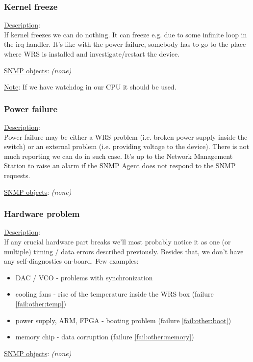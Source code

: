\subsubsection{\bf Kernel freeze}
		\begin{pck_descr}
			\item [] \underline{Description}:\\
				If kernel freezes we can do nothing. It can freeze e.g. due to some
				infinite loop in the irq handler. It's like with the power failure,
				somebody has to go to the place where WRS is installed and
				investigate/restart the device.
			\item [] \underline{SNMP objects}: \emph{(none)}
			\item [] \underline{Note}:
				If we have watchdog in our CPU it should be used.
		\end{pck_descr}

\subsubsection{\bf Power failure}
		\begin{pck_descr}
			\item [] \underline{Description}:\\
				Power failure may be either a WRS problem (i.e. broken power supply
				inside the switch) or an external problem (i.e. providing voltage to the
				device). There is not much reporting we can do in such case. It's up to
				the Network Management Station to raise an alarm if the SNMP Agent does
				not respond to the SNMP requests.
			\item [] \underline{SNMP objects}: \emph{(none)}
		\end{pck_descr}

\subsubsection{\bf Hardware problem}
		\begin{pck_descr}
			\item [] \underline{Description}:\\
				If any crucial hardware part breaks we'll most probably notice it as one
				(or multiple) timing / data errors described previously. Besides that,
				we don't have any self-diagnostics on-board. Few examples:
				\begin{itemize}
					\item DAC / VCO - problems with synchronization
					\item cooling	fans - rise of the temperature inside the WRS box
						(failure \ref{fail:other:temp})
					\item power supply, ARM, FPGA - booting problem (failure
						\ref{fail:other:boot})
					\item memory chip - data corruption (failure \ref{fail:other:memory})
				\end{itemize}
			\item [] \underline{SNMP objects}: \emph{(none)}
		\end{pck_descr}

